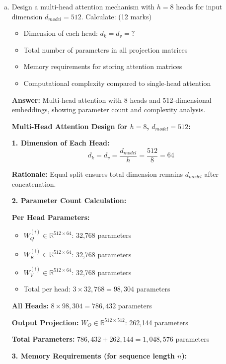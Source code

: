 \documentclass[12pt]{article}
\newcommand{\answer}[1]{{\color{answercolor}\textbf{Answer:} #1}}
\newcommand{\explanation}[1]{{\color{explanationcolor}#1}}
\begin{document}
\begin{center}
\begin{enumerate}[(a)]
\begin{enumerate}[(a)]
    \item Design a multi-head attention mechanism with $h=8$ heads for input dimension $d_{model}=512$. Calculate: \hfill (12 marks)
    \begin{itemize}
        \item Dimension of each head: $d_k = d_v = ?$
        \item Total number of parameters in all projection matrices
        \item Memory requirements for storing attention matrices
        \item Computational complexity compared to single-head attention
    \end{itemize}
    
    \answer{Multi-head attention with 8 heads and 512-dimensional embeddings, showing parameter count and complexity analysis.}
    
    \explanation{
    \textbf{Multi-Head Attention Design for $h=8$, $d_{model}=512$:}
    
    \textbf{1. Dimension of Each Head:}
    $$d_k = d_v = \frac{d_{model}}{h} = \frac{512}{8} = 64$$
    
    \textbf{Rationale:} Equal split ensures total dimension remains $d_{model}$ after concatenation.
    
    \textbf{2. Parameter Count Calculation:}
    
    \textbf{Per Head Parameters:}
    \begin{itemize}
        \item $W_Q^{(i)} \in \mathbb{R}^{512 \times 64}$: 32,768 parameters
        \item $W_K^{(i)} \in \mathbb{R}^{512 \times 64}$: 32,768 parameters  
        \item $W_V^{(i)} \in \mathbb{R}^{512 \times 64}$: 32,768 parameters
        \item Total per head: $3 \times 32,768 = 98,304$ parameters
    \end{itemize}
    
    \textbf{All Heads:}
    $8 \times 98,304 = 786,432$ parameters
    
    \textbf{Output Projection:}
    $W_O \in \mathbb{R}^{512 \times 512}$: 262,144 parameters
    
    \textbf{Total Parameters:} $786,432 + 262,144 = 1,048,576$ parameters
    
    \textbf{3. Memory Requirements (for sequence length $n$):}
    
}
\end{enumerate}
\end{enumerate}
\end{center}
\end{document}

